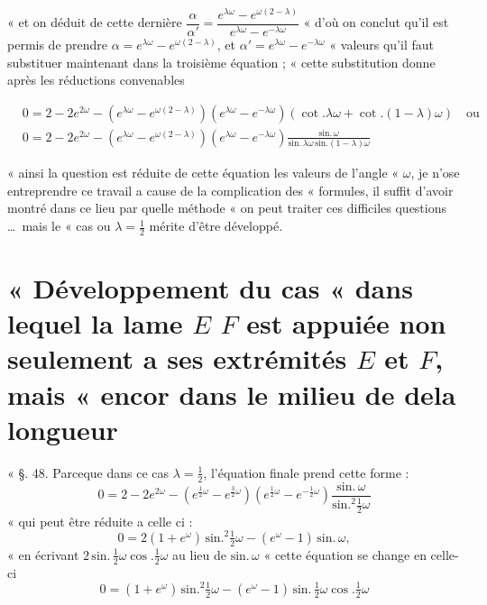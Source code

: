 \documentclass[11pt,a4paper]{article}
\begin{document}
« et on déduit de cette dernière
$\dfrac{\alpha}{\alpha'}=\dfrac{e^{\lambda\omega}-e^{\omega(2-\lambda)}}{e^{\lambda\omega}-e^{-\lambda\omega}}$
« d'où on conclut qu'il est permis de prendre
$\alpha=e^{\lambda\omega}-e^{\omega(2-\lambda)}$, et
$\alpha'=e^{\lambda\omega}-e^{-\lambda\omega}$ « valeurs qu'il faut
substituer maintenant dans la troisième équation ; « cette substitution
donne après les réductions convenables

\begin{align*}
&0=2-2e^{2\omega}-(e^{\lambda\omega}-e^{\omega(2-\lambda)})(e^{\lambda\omega}-e^{-\lambda\omega})(\cot.\lambda\omega+\cot.(1-\lambda)\omega) \quad\text{ou} \\
&0=2-2e^{2\omega}-(e^{\lambda\omega}-e^{\omega(2-\lambda)})(e^{\lambda\omega}-e^{-\lambda\omega})\frac{\text{sin.}\,\omega}{\text{sin.}\,\lambda\omega\,\text{sin.}(1-\lambda)\omega}
\end{align*}

« ainsi la question est réduite de cette équation les valeurs de l'angle
« $\omega$, je n'ose entreprendre ce travail a cause de la complication des
« formules, il suffit d'avoir montré dans ce lieu par quelle méthode « on
peut traiter ces difficiles questions \ldots\ mais le « cas ou
$\lambda=\frac{1}{2}$ mérite d'être développé.

\section{« Développement du cas « dans lequel la lame $E$ $F$ est appuiée non seulement a ses extrémités $E$ et $F$, mais « encor dans le milieu de dela longueur}


« §. 48. Parceque dans ce cas $\lambda=\frac{1}{2}$, l'équation finale prend
cette forme :
\[ 0=2-2e^{2\omega}-(e^{\frac{1}{2}\omega}-e^{\frac{3}{2}\omega})(e^{\frac{1}{2}\omega}-e^{-\frac{1}{2}\omega})\frac{\text{sin.}\,\omega}{\text{sin.}^2\frac{1}{2}\omega} \]
« qui peut être réduite a celle ci : \struck{\ill{}}
\[ 0=2(1+e^{\omega})\,\text{sin.}^2\tfrac{1}{2}\omega-(e^{\omega}-1)\,\text{sin.}\,\omega, \]
« en écrivant $2\,\text{sin.}\,\frac{1}{2}\omega\cos.\frac{1}{2}\omega$ au
lieu de $\text{sin.}\,\omega$ « cette équation se change en celle-ci
\[ 0=(1+e^{\omega})\,\text{sin.}^2\tfrac{1}{2}\omega-(e^{\omega}-1)\,\text{sin.}\,\tfrac{1}{2}\omega\cos.\tfrac{1}{2}\omega \]
\end{document}
